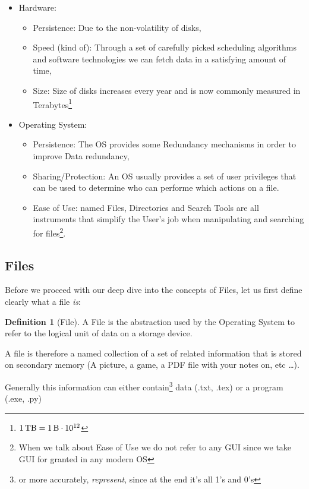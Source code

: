 \documentclass[openright, twoside]{report}
\theoremstyle{definition}
\newtheorem{definition}{Definition}[section]
\theoremstyle{example}
\begin{document}
\begin{itemize}
	\item Hardware:
	\begin{itemize}
		\item Persistence: Due to the non-volatility of disks,
		\item Speed (kind of): Through a set of carefully picked scheduling algorithms and software 
		technologies we can fetch data in a satisfying amount of time, 
		\item Size: Size of disks increases every year and is now commonly measured in Terabytes\footnote{
			$\SI{1}{\tera\byte} = \SI{1}{\byte}\cdot10^{12}$
		}
	\end{itemize}
	\item Operating System:
	\begin{itemize}
		\item Persistence: The OS provides some Redundancy mechanisms in order to improve Data redundancy,
		\item Sharing/Protection: An OS usually provides a set of user privileges that can be used to determine who 
		can performe which actions on a file.
		\item Ease of Use: named Files, Directories and Search Tools are all instruments that simplify the 
		User's job when manipulating and searching for files\footnote{When we talk about Ease of Use we do not 
		refer to any GUI since we take GUI for granted in any modern OS}.
	\end{itemize}
\end{itemize}

\subsection{Files}
Before we proceed with our deep dive into the concepts of Files, let us first 
define clearly what a file \emph{is}:

\begin{definition}[File]
	A File is the abstraction used by the Operating System to refer to the logical 
	unit of data on a storage device.
\end{definition}

A file is therefore a named collection of a set of related information that is stored 
on secondary memory (A picture, a game, a PDF file with your notes on, etc \dots).

Generally this information can either contain\footnote{or more accurately, \emph{represent}, 
since at the end it's all 1's and 0's} data (.txt, .tex) or a program (.exe, .py)
\end{document}
